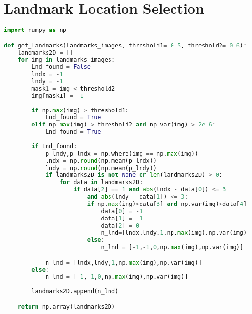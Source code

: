 \section{Landmark Location Selection}
\label{AppendixA2}
\begin{lstlisting}[language=Python, caption=Landmark Location Selection]
import numpy as np

def get_landmarks(landmarks_images, threshold1=-0.5, threshold2=-0.6):
    landmarks2D = []
    for img in landmarks_images:
        Lnd_found = False
        lndx = -1
        lndy = -1
        mask1 = img < threshold2
        img[mask1] = -1
        
        if np.max(img) > threshold1:
            Lnd_found = True
        elif np.max(img) > threshold2 and np.var(img) > 2e-6:
            Lnd_found = True
            
        if Lnd_found:
            p_lndy,p_lndx = np.where(img == np.max(img))
            lndx = np.round(np.mean(p_lndx))
            lndy = np.round(np.mean(p_lndy))
            if landmarks2D is not None or len(landmarks2D) > 0:
                for data in landmarks2D:
                    if data[2] == 1 and abs(lndx - data[0]) <= 3 
                        and abs(lndy - data[1]) <= 3:
                        if np.max(img)>data[3] and np.var(img)>data[4]:
                            data[0] = -1
                            data[1] = -1
                            data[2] = 0
                            n_lnd=[lndx,lndy,1,np.max(img),np.var(img)]
                        else:
                            n_lnd = [-1,-1,0,np.max(img),np.var(img)]

            n_lnd = [lndx,lndy,1,np.max(img),np.var(img)]
        else:
            n_lnd = [-1,-1,0,np.max(img),np.var(img)]
        
        landmarks2D.append(n_lnd)

    return np.array(landmarks2D)
\end{lstlisting}